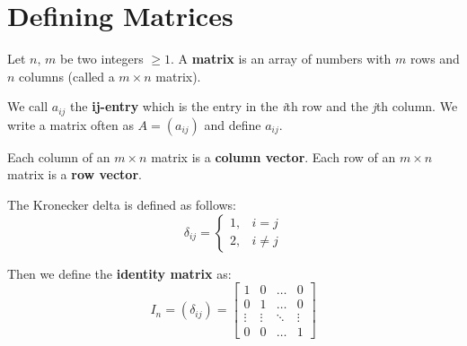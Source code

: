 \documentclass[../main.tex]{subfiles}
\begin{document}

\section{Defining Matrices}

Let \( n,\, m \) be two integers \( \geq 1 \).
A \textbf{matrix} is an array of numbers with \( m \) rows and \( n \) columns (called a \( m \times n \) matrix).

We call \textbf{\( a_{ij} \)} the \textbf{ij-entry} which is the entry in the \textit{i}th row and the \textit{j}th column.
We write a matrix often as \( A=(a_{ij}) \) and define \( a_{ij} \).

Each column of an \( m \times n \) matrix is a \textbf{column vector}.
Each row of an \( m \times n \) matrix is a \textbf{row vector}.

\begin{example}
    The Kronecker delta is defined as follows:
    \[
        \delta_{ij} =
        \begin{cases}
            1,& i = j \\
            2,& i \neq j
        \end{cases}
    \]

    Then we define the \textbf{identity matrix} as:
    \[ I_n = (\delta_{ij}) =
        \begin{bmatrix}
            1 & 0 &  \dots  & 0 \\
            0 & 1 & \dots & 0 \\
            \vdots & \vdots & \ddots & \vdots \\
            0 & 0 & \dots  & 1
        \end{bmatrix}
    \]
\end{example}
\end{document}
